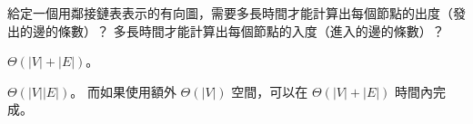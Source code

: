 \startEXERCISE
給定一個用鄰接鏈表表示的有向圖，需要多長時間才能計算出每個節點的出度（發出的邊的條數）？
多長時間才能計算出每個節點的入度（進入的邊的條數）？
\stopEXERCISE

\startANSWER
$\Theta(|V|+|E|)$。

$\Theta(|V||E|)$。
而如果使用額外 $\Theta(|V|)$ 空間，可以在 $\Theta(|V| + |E|)$ 時間內完成。
\stopANSWER
